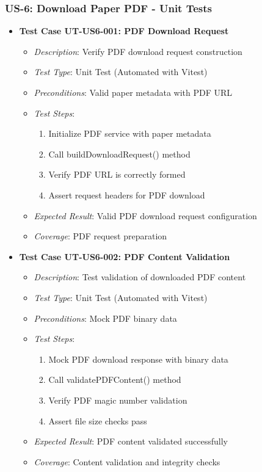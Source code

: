\documentclass[12pt]{article}
\begin{document}
\subsubsection{US-6: Download Paper PDF - Unit Tests}
\begin{itemize}
  \item \textbf{Test Case UT-US6-001: PDF Download Request}
    \begin{itemize}
      \item \textit{Description}: Verify PDF download request construction
      \item \textit{Test Type}: Unit Test (Automated with Vitest)
      \item \textit{Preconditions}: Valid paper metadata with PDF URL
      \item \textit{Test Steps}:
        \begin{enumerate}
          \item Initialize PDF service with paper metadata
          \item Call buildDownloadRequest() method
          \item Verify PDF URL is correctly formed
          \item Assert request headers for PDF download
        \end{enumerate}
      \item \textit{Expected Result}: Valid PDF download request configuration
      \item \textit{Coverage}: PDF request preparation
    \end{itemize}

  \item \textbf{Test Case UT-US6-002: PDF Content Validation}
    \begin{itemize}
      \item \textit{Description}: Test validation of downloaded PDF content
      \item \textit{Test Type}: Unit Test (Automated with Vitest)
      \item \textit{Preconditions}: Mock PDF binary data
      \item \textit{Test Steps}:
        \begin{enumerate}
          \item Mock PDF download response with binary data
          \item Call validatePDFContent() method
          \item Verify PDF magic number validation
          \item Assert file size checks pass
        \end{enumerate}
      \item \textit{Expected Result}: PDF content validated successfully
      \item \textit{Coverage}: Content validation and integrity checks
    \end{itemize}
\end{itemize}
\end{document}
